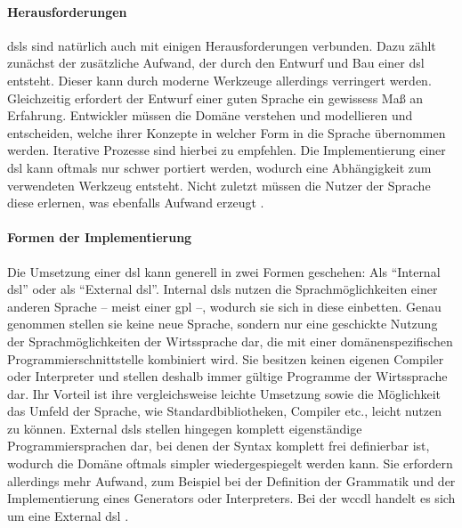     \paragraph{Herausforderungen}
    \glspl{dsl} sind natürlich auch mit einigen Herausforderungen verbunden.
    Dazu zählt zunächst der zusätzliche Aufwand, der durch den Entwurf und Bau einer \gls{dsl} entsteht.
    Dieser kann durch moderne Werkzeuge allerdings verringert werden.
    Gleichzeitig erfordert der Entwurf einer guten Sprache ein gewissess Maß an Erfahrung.
    Entwickler müssen die Domäne verstehen und modellieren und entscheiden,
    welche ihrer Konzepte in welcher Form in die Sprache übernommen werden.
    Iterative Prozesse sind hierbei zu empfehlen.
    Die Implementierung einer \gls{dsl} kann oftmals nur schwer portiert werden,
    wodurch eine Abhängigkeit zum verwendeten Werkzeug entsteht.
    Nicht zuletzt müssen die Nutzer der Sprache diese erlernen,
    was ebenfalls Aufwand erzeugt
    \cite[Kapitel 2.6]{voelter:DslEngineering}.

    \paragraph{Formen der Implementierung}
    Die Umsetzung einer \gls{dsl} kann generell in zwei Formen geschehen:
    Als "`Internal \gls{dsl}"' oder als "`External \gls{dsl}"'.
    Internal \glspl{dsl} nutzen die Sprachmöglichkeiten einer anderen Sprache
    -- meist einer \gls{gpl} --, wodurch sie sich in diese einbetten.
    Genau genommen stellen sie keine neue Sprache,
    sondern nur eine geschickte Nutzung der Sprachmöglichkeiten
    der Wirtssprache dar, die mit einer domänenspezifischen Programmierschnittstelle kombiniert wird.
    Sie besitzen keinen eigenen Compiler oder Interpreter und stellen deshalb immer gültige Programme
    der Wirtssprache dar.
    Ihr Vorteil ist ihre vergleichsweise leichte Umsetzung sowie die Möglichkeit das Umfeld der Sprache,
    wie Standardbibliotheken, Compiler etc., leicht nutzen zu können.
    External \glspl{dsl} stellen hingegen komplett eigenständige Programmiersprachen dar,
    bei denen der Syntax komplett frei definierbar ist,
    wodurch die Domäne oftmals simpler wiedergespiegelt werden kann.
    Sie erfordern allerdings mehr Aufwand, zum Beispiel bei der Definition der Grammatik
    und der Implementierung eines Generators oder Interpreters.
    Bei der \gls{wccdl} handelt es sich um eine External \gls{dsl}
    \cite[Kapitel 2.8.1]{voelter:DslEngineering}.

